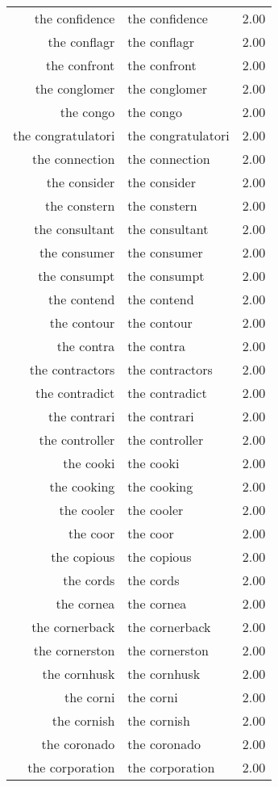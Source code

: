 \begin{table}[ht]
\begin{tabular}{rlr}
  the confidence & the confidence & 2.00 \\ 
  the conflagr & the conflagr & 2.00 \\ 
  the confront & the confront & 2.00 \\ 
  the conglomer & the conglomer & 2.00 \\ 
  the congo & the congo & 2.00 \\ 
  the congratulatori & the congratulatori & 2.00 \\ 
  the connection & the connection & 2.00 \\ 
  the consider & the consider & 2.00 \\ 
  the constern & the constern & 2.00 \\ 
  the consultant & the consultant & 2.00 \\ 
  the consumer & the consumer & 2.00 \\ 
  the consumpt & the consumpt & 2.00 \\ 
  the contend & the contend & 2.00 \\ 
  the contour & the contour & 2.00 \\ 
  the contra & the contra & 2.00 \\ 
  the contractors & the contractors & 2.00 \\ 
  the contradict & the contradict & 2.00 \\ 
  the contrari & the contrari & 2.00 \\ 
  the controller & the controller & 2.00 \\ 
  the cooki & the cooki & 2.00 \\ 
  the cooking & the cooking & 2.00 \\ 
  the cooler & the cooler & 2.00 \\ 
  the coor & the coor & 2.00 \\ 
  the copious & the copious & 2.00 \\ 
  the cords & the cords & 2.00 \\ 
  the cornea & the cornea & 2.00 \\ 
  the cornerback & the cornerback & 2.00 \\ 
  the cornerston & the cornerston & 2.00 \\ 
  the cornhusk & the cornhusk & 2.00 \\ 
  the corni & the corni & 2.00 \\ 
  the cornish & the cornish & 2.00 \\ 
  the coronado & the coronado & 2.00 \\ 
  the corporation & the corporation & 2.00 \\ 

\end{tabular}
\end{table}
